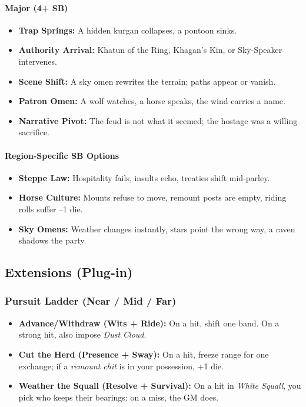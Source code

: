 \paragraph{Major (4+ SB)}
\begin{itemize}[nosep]
  \item \textbf{Trap Springs:} A hidden kurgan collapses, a pontoon sinks.
  \item \textbf{Authority Arrival:} Khatun of the Ring, Khagan's Kin, or Sky-Speaker intervenes.
  \item \textbf{Scene Shift:} A sky omen rewrites the terrain; paths appear or vanish.
  \item \textbf{Patron Omen:} A wolf watches, a horse speaks, the wind carries a name.
  \item \textbf{Narrative Pivot:} The feud is not what it seemed; the hostage was a willing sacrifice.
\end{itemize}

\paragraph{Region-Specific SB Options}
\begin{itemize}[nosep]
  \item \textbf{Steppe Law:} Hospitality fails, insults echo, treaties shift mid-parley.
  \item \textbf{Horse Culture:} Mounts refuse to move, remount posts are empty, riding rolls suffer --1 die.
  \item \textbf{Sky Omens:} Weather changes instantly, stars point the wrong way, a raven shadows the party.
\end{itemize}

\subsection{Extensions (Plug-in)}

\subsubsection{Pursuit Ladder (Near / Mid / Far)}
\begin{itemize}[nosep]
  \item \textbf{Advance/Withdraw (Wits + Ride):} On a hit, shift one band. On a strong hit, also impose \emph{Dust Cloud}.
  \item \textbf{Cut the Herd (Presence + Sway):} On a hit, freeze range for one exchange; if a \emph{remount chit} is in your possession, +1 die.
  \item \textbf{Weather the Squall (Resolve + Survival):} On a hit in \emph{White Squall}, you pick who keeps their bearings; on a miss, the GM does.
\end{itemize}

